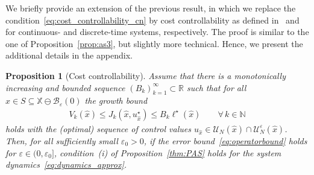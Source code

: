 \documentclass{article}
\numberwithin{equation}{section}
\newtheorem{proposition}[theorem]{Proposition}
\newcommand{\bX}{\mathbb X}
\begin{document}
	\noindent We briefly provide an extension of the previous result, in which we replace the condition~\eqref{eq:cost_controllability_cn} by cost controllability as defined in~\cite{CoroGrun20} and~\cite{Wort11} for continuous- and discrete-time systems, respectively. 
	The proof is similar to the one of Proposition~\ref{prop:as3}, but slightly more technical. Hence, we present the additional details in the appendix.
	\begin{proposition}[Cost controllability]\label{prop:link_costcont}
		Assume that there is a monotonically increasing and bounded sequence $(B_k)_{k = 1}^\infty \subset \mathbb R$ such that for all $x \in S \subseteq \bX \ominus \mathcal{B}_\varepsilon(0)$ the growth bound
		\begin{align}\label{eq:cost_controllability}
		V_k(\hat{x}) \leq J_k(\hat{x},u_{\hat{x}}^\star) \leq B_k \ell^\star(\hat{x}) \qquad\forall\,k\in \mathbb{N}
		\end{align}
		holds with the (optimal) sequence of control values $u_{\hat{x}} \in \mathcal{U}_N(\hat{x}) \cap \mathcal{U}_N^\varepsilon(\hat{x})$.
		Then, for all sufficiently small $\varepsilon_0 > 0$, if the error bound~\eqref{eq:operatorbound} holds for $\varepsilon \in (0,\varepsilon_0]$, condition~(i) of Proposition~\ref{thm:PAS} holds for the system dynamics~\eqref{eq:dynamics_approx}.
	\end{proposition}
	
\end{document}
